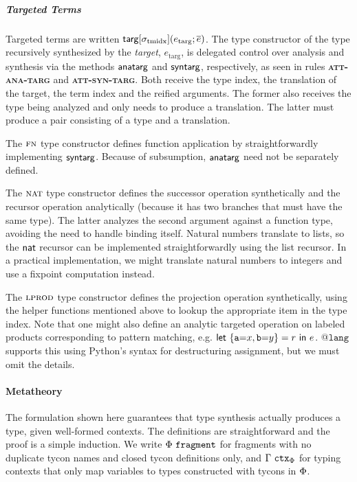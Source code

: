 \documentclass[9pt]{sigplanconf}
\newcommand{\sigmat}[1]{\sigma_{\text{#1}}}
\newcommand{\FF}[1]{{\sf #1}}
\newcommand{\rulename}[1]{{\textsc{\textbf{#1}}}}
\begin{document}
\subparagraph{Targeted Terms} Targeted terms are written $\FF{targ}[\sigmat{tmidx}](e_\text{targ}; \overline{e})$. The type constructor of the type recursively synthesized by the \emph{target}, $e_\text{targ}$, is delegated control over analysis and synthesis via the methods $\FF{anatarg}$ and $\FF{syntarg}$, respectively, as seen in rules \rulename{att-ana-targ} and \rulename{att-syn-targ}. Both receive the type index, the translation of the target, the term index and the reified arguments. The former also receives the type being analyzed and only needs to produce a translation. The latter must produce a pair consisting of a type and a translation.

The $\textsc{fn}$ type constructor defines function application by straightforwardly implementing $\FF{syntarg}$.  Because of subsumption, $\FF{anatarg}$ need not be separately defined.

The $\textsc{nat}$ type constructor defines the successor operation synthetically and the recursor operation analytically (because it has two branches that must have the same type). The latter analyzes the second argument against a function type, avoiding the need to handle binding itself. Natural numbers translate to lists, so the $\FF{nat}$ recursor can be implemented straightforwardly using the list recursor. In a practical implementation, we might translate natural numbers to integers and use a fixpoint computation instead.

The $\textsc{lprod}$ type constructor defines the projection operation synthetically, using the helper functions mentioned above to lookup the appropriate item in the type index. Note that one might also define an analytic targeted operation on labeled products corresponding to pattern matching, e.g. $\FF{let}~\{\texttt{a}{=}x, \texttt{b}{=}y\}=r~\FF{in}~e$. @$\texttt{lang}$ supports this using Python's syntax for destructuring assignment, but we must omit the details.

\paragraph{Metatheory} The formulation shown here guarantees that type synthesis actually produces a type, given well-formed contexts. The definitions are straightforward and the proof is a simple induction. We write $\Phi~\mathtt{fragment}$ for fragments with no duplicate tycon names and closed tycon definitions only, and $\Gamma~\mathtt{ctx}_\Phi$ for typing contexts that only map variables to types constructed with tycons in $\Phi$. %
\end{document}
